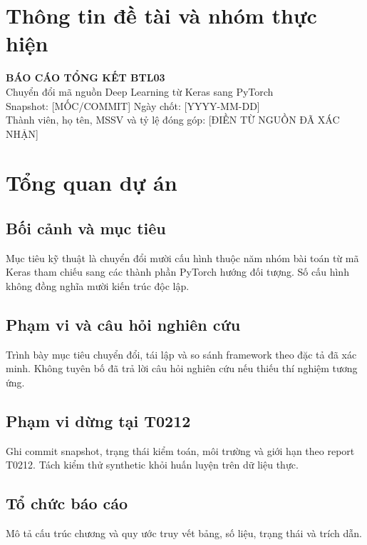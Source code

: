 \chapter*{Thông tin đề tài và nhóm thực hiện}
\begin{center}
{\Large\bfseries BÁO CÁO TỔNG KẾT BTL03}\\[0.5em]
{\large Chuyển đổi mã nguồn Deep Learning từ Keras sang PyTorch}\\[1em]
Snapshot: [MỐC/COMMIT] \quad Ngày chốt: [YYYY-MM-DD]\\
Thành viên, họ tên, MSSV và tỷ lệ đóng góp: [ĐIỀN TỪ NGUỒN ĐÃ XÁC NHẬN]
\end{center}

\chapter{Tổng quan dự án}
\section{Bối cảnh và mục tiêu}
Mục tiêu kỹ thuật là chuyển đổi mười cấu hình thuộc năm nhóm bài toán từ mã Keras tham chiếu sang các thành phần PyTorch hướng đối tượng. Số cấu hình không đồng nghĩa mười kiến trúc độc lập.

\section{Phạm vi và câu hỏi nghiên cứu}
Trình bày mục tiêu chuyển đổi, tái lập và so sánh framework theo đặc tả đã xác minh. Không tuyên bố đã trả lời câu hỏi nghiên cứu nếu thiếu thí nghiệm tương ứng.

\section{Phạm vi dừng tại T0212}
Ghi commit snapshot, trạng thái kiểm toán, môi trường và giới hạn theo report T0212. Tách kiểm thử synthetic khỏi huấn luyện trên dữ liệu thực.

\section{Tổ chức báo cáo}
Mô tả cấu trúc chương và quy ước truy vết bảng, số liệu, trạng thái và trích dẫn.